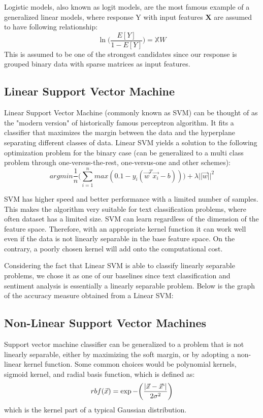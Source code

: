 \documentclass[comsoc,conference]{IEEEtran}
\begin{document}
Logistic models, also known as logit models, are the most famous example of a generalized linear models, where response Y with input features $\mathbf{X}$ are assumed to have following relationship:
\[\ln\bigg(\frac{E[Y]}{1-E[Y]}\bigg) = \mathbb{X}W\]
This is assumed to be one of the strongest candidates since our response is grouped binary data with sparse matrices as input features.

\subsection{Linear Support Vector Machine}

Linear Support Vector Machine (commonly known as SVM) can be thought of as the "modern version" of historically famous perceptron algorithm. It fits a classifier that maximizes the margin between the data and the hyperplane separating different classes of data. Linear SVM yields a solution to the following optimization problem for the binary case (can be generalized to a multi class problem through one-versus-the-rest, one-versus-one and other schemes):
\[
argmin \frac{1}{n} \bigg(\sum_{i=1}^n max(0. 1-y_i(\vec{w}^T\vec{x_i}-b))\bigg) + \lambda||\vec{w}||^2
\]

SVM has higher speed and better performance with a limited number of samples. This makes the algorithm very suitable for text classification problems, where often dataset has a limited size. SVM can learn regardless of the dimension of the feature space. Therefore, with an appropriate kernel function it can work well even if the data is not linearly separable in the base feature space. On the contrary, a poorly chosen kernel will add onto the computational cost. 

Considering the fact that Linear SVM is able to classify linearly separable problems, we chose it as one of our baselines since text classification and sentiment analysis is essentially a linearly separable problem. Below is the graph of the accuracy measure obtained from a Linear SVM:

\subsection{Non-Linear Support Vector Machines}

Support vector machine classifier can be generalized to a problem that is not linearly separable, either by maximizing the soft margin, or by adopting a non-linear kernel function. Some common choices would be polynomial kernels, sigmoid kernel, and radial basis function, which is defined as:
\[
rbf(\vec{x}) = \exp{-\bigg(\frac{|\vec{x}-\vec{x}`|}{2\sigma^2}\bigg)}
\]
which is the kernel part of a typical Gaussian distribution.
\end{document}
